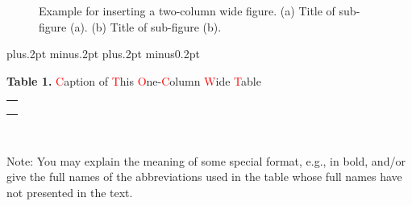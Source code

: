\documentclass[twoside]{article}
\begin{document}
\begin{multicols}{2}
\setcounter{figure}{1}
\begin{figure}[!htb]
\centering
  \caption{Example for inserting a two-column wide figure. (a) Title of sub-figure (a). (b) Title of sub-figure (b).}
\end{figure}
\baselineskip=18pt plus.2pt minus.2pt
\parskip=0pt plus.2pt minus0.2pt

\vspace{2mm}

\tabcolsep 12pt
\renewcommand\arraystretch{1.3}
\begin{center}
{\footnotesize{\bf Table 1.} \textcolor{red}{C}aption of \textcolor{red}{T}his \textcolor{red}{O}ne-\textcolor{red}{C}olumn \textcolor{red}{W}ide \textcolor{red}{T}able}\\
\vspace{2mm}
\footnotesize{
\begin{tabular*}{\linewidth}{c}\hline\hline\hline
\\\hline
\\
\\
\\\hline\hline\hline
\end{tabular*}%
\\\vspace{1mm}\parbox{8.3cm}{Note: You may explain the meaning of some special format, e.g., in bold, and/or give the full names of the abbreviations used in the table whose full names have not presented in the text.}
}
\end{center}

\vspace{1mm}


\end{multicols}
\end{document}
